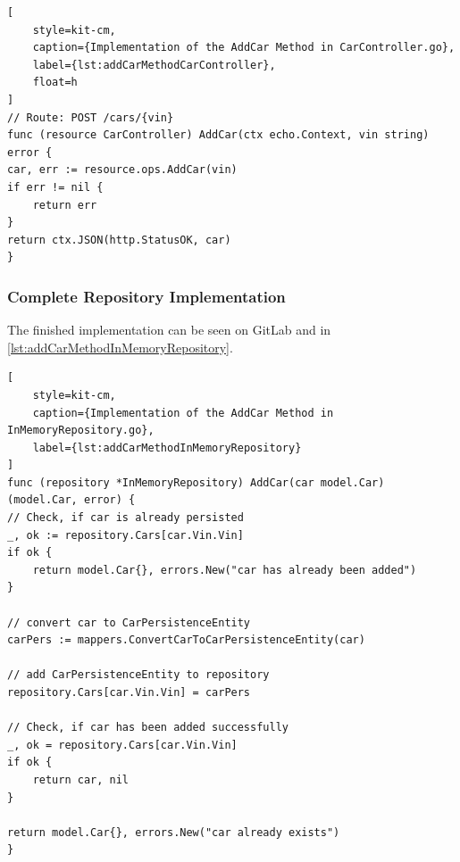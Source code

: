 \begin{lstlisting}[
    style=kit-cm,
    caption={Implementation of the AddCar Method in CarController.go},
    label={lst:addCarMethodCarController},
    float=h
]
// Route: POST /cars/{vin}
func (resource CarController) AddCar(ctx echo.Context, vin string) error {
car, err := resource.ops.AddCar(vin)
if err != nil {
    return err
}
return ctx.JSON(http.StatusOK, car)
}
\end{lstlisting}

\subsubsection*{Complete Repository Implementation}
The finished implementation can be seen on GitLab and in \autoref{lst:addCarMethodInMemoryRepository}.

\begin{lstlisting}[
    style=kit-cm,
    caption={Implementation of the AddCar Method in InMemoryRepository.go},
    label={lst:addCarMethodInMemoryRepository}
]
func (repository *InMemoryRepository) AddCar(car model.Car) (model.Car, error) {
// Check, if car is already persisted
_, ok := repository.Cars[car.Vin.Vin]
if ok {
    return model.Car{}, errors.New("car has already been added")
}

// convert car to CarPersistenceEntity
carPers := mappers.ConvertCarToCarPersistenceEntity(car)

// add CarPersistenceEntity to repository
repository.Cars[car.Vin.Vin] = carPers

// Check, if car has been added successfully
_, ok = repository.Cars[car.Vin.Vin]
if ok {
    return car, nil
}

return model.Car{}, errors.New("car already exists")
}
\end{lstlisting}
